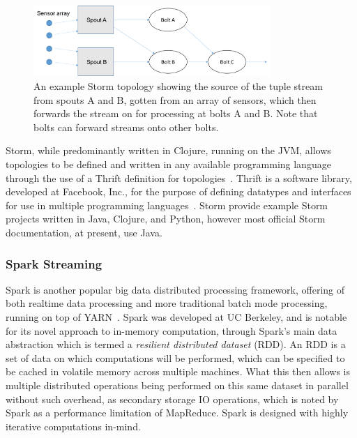 \begin{figure}[ht]
  \centering
  \includegraphics[width=0.8\textwidth]{includes/figures/fig_storm_topology1}
  \caption{An example Storm topology showing the source of the tuple stream from spouts A and B, gotten from an array
  of sensors, which then forwards the stream on for processing at bolts A and B. Note that bolts can forward streams
  onto other bolts.}
  \label{fig:storm_topology}
\end{figure}

Storm, while predominantly written in Clojure, running on the JVM, allows topologies to be defined and written in any
available programming language through the use of a Thrift definition for topologies~\cite{About8:online}. Thrift is
a software library, developed at Facebook, Inc., for the purpose of defining datatypes and interfaces for use in
multiple programming languages~\cite{slee2007thrift}. Storm provide example Storm projects written in Java, Clojure,
and Python, however most official Storm documentation, at present, use Java.



\subsubsection{Spark Streaming} %
\label{ssub:spark_streaming}

Spark is another popular big data distributed processing framework, offering of both realtime data processing
and more traditional batch mode processing, running on top of YARN~\cite{zaharia2010spark}. Spark was developed at UC
Berkeley, and is notable for its novel approach to in-memory computation, through Spark's main data abstraction which is
termed a \textit{resilient distributed dataset} (RDD). An RDD is a set of data on which computations will be performed,
which can be specified to be cached in volatile memory across multiple machines. What this then allows is multiple
distributed operations being performed on this same dataset in parallel without such overhead, as secondary storage
IO operations, which is noted by Spark as a performance limitation of MapReduce. Spark is designed with highly iterative
computations in-mind.

